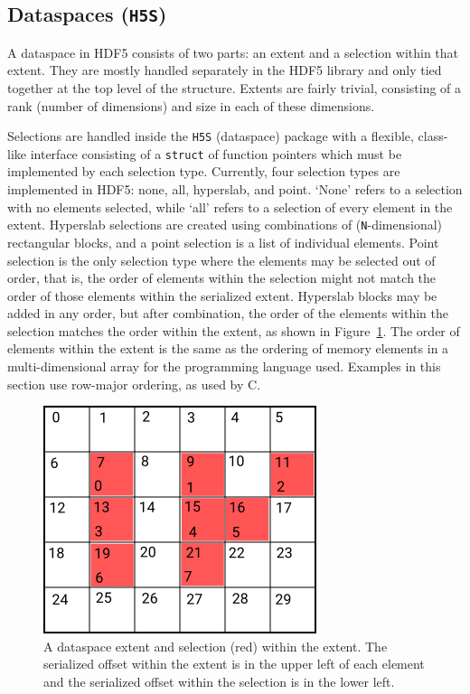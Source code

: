 \subsection{Dataspaces (\texttt{H5S})}


A dataspace in HDF5 consists of two parts: an extent and a selection within that extent. They are mostly handled separately in the HDF5 library and only tied together at the top level of the structure. Extents are fairly trivial, consisting of a rank (number of dimensions) and size in each of these dimensions.

Selections are handled inside the \texttt{H5S} (dataspace) package with a flexible, class-like interface consisting of a \texttt{struct} of function pointers which must be implemented by each selection type. Currently, four selection types are implemented in HDF5: none, all, hyperslab, and point. `None' refers to a selection with no elements selected, while `all' refers to a selection of every element in the extent. Hyperslab selections are created using combinations of (\texttt{N}-dimensional) rectangular blocks, and a point selection is a list of individual elements. Point selection is the only selection type where the elements may be selected out of order, that is, the order of elements within the selection might not match the order of those elements within the serialized extent. Hyperslab blocks may be added in any order, but after combination, the order of the elements within the selection matches the order within the extent, as shown in Figure~\ref{fig:serial-offsets}. The order of elements within the extent is the same as the ordering of memory elements in a multi-dimensional array for the programming language used. Examples in this section use row-major ordering, as used by C.

\begin{figure}[h]
\centering
\includegraphics[scale=0.8]{images/Dataspace_serial_offsets.png}
\caption{A dataspace extent and selection (red) within the extent. The serialized offset within the extent is in the upper left of each element and the serialized offset within the selection is in the lower left.}
\label{fig:serial-offsets}
\end{figure}

